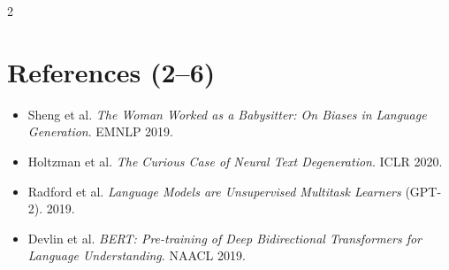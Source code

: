 \documentclass[10pt]{article}
\begin{document}
\begin{multicols}{2}
\section*{References (2--6)}
\begin{itemize}
  \item Sheng et al. \textit{The Woman Worked as a Babysitter: On Biases in Language Generation}. EMNLP 2019.
  \item Holtzman et al. \textit{The Curious Case of Neural Text Degeneration}. ICLR 2020.
  \item Radford et al. \textit{Language Models are Unsupervised Multitask Learners} (GPT-2). 2019.
  \item Devlin et al. \textit{BERT: Pre-training of Deep Bidirectional Transformers for Language Understanding}. NAACL 2019.
\end{itemize}

\end{multicols}
\end{document}
